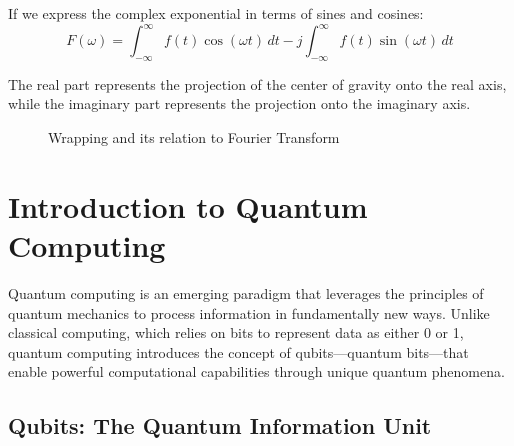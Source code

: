 \documentclass{article}
\begin{document}
If we express the complex exponential in terms of sines and cosines:
\[
    F(\omega) = \int_{-\infty}^{\infty} f(t) \cos(\omega t) \, dt - j\int_{-\infty}^{\infty} f(t) \sin(\omega t) \, dt
\]

The real part represents the projection of the center of gravity onto the real axis, while the imaginary part represents the projection onto the imaginary axis.

\begin{figure}[p]
    \centering
    \caption{Wrapping and its relation to Fourier Transform}
    \label{fig:complete_fourier}
\end{figure}


\section{Introduction to Quantum Computing}

\begin{infobox}[title=Quantum Computing Fundamentals]
    Quantum computing is an emerging paradigm that leverages the principles of quantum mechanics to process information in fundamentally new ways. Unlike classical computing, which relies on bits to represent data as either 0 or 1, quantum computing introduces the concept of qubits---quantum bits---that enable powerful computational capabilities through unique quantum phenomena.
\end{infobox}

\subsection{Qubits: The Quantum Information Unit}
\end{document}
